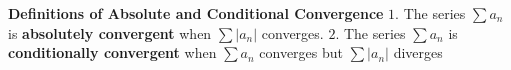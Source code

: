 \nopagenumbers
{\bf Definitions of Absolute and Conditional Convergence}
\vskip 6pt
$1.$ The series $\sum a_n$ is {\bf absolutely convergent} when $\sum|a_n|$ converges.
\vskip 1mm
$2.$ The series $\sum a_n$ is {\bf conditionally convergent} when $\sum a_n$ converges but $\sum|a_n|$ diverges
\vfill\eject
